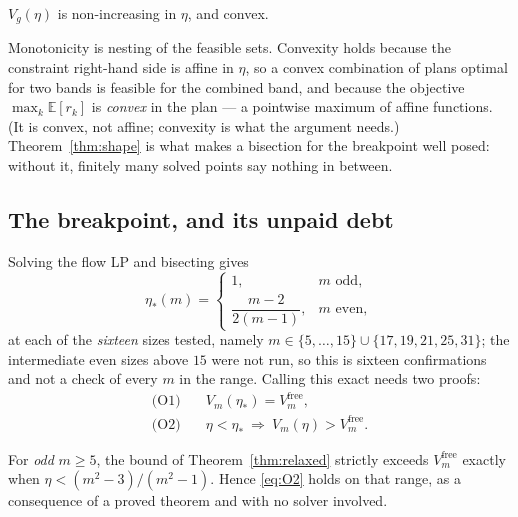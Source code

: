 \begin{theorem}
\label{thm:shape}
$V_{g}(\eta)$ is non-increasing in $\eta$, and convex.
\end{theorem}


Monotonicity is nesting of the feasible sets. Convexity holds because the constraint
right-hand side is affine in $\eta$, so a convex combination of plans optimal for two bands
is feasible for the combined band, and because the objective
$\max_{k}\mathbb{E}[r_{k}]$ is \emph{convex} in the plan --- a pointwise maximum of affine
functions. (It is convex, not affine; convexity is what the argument needs.) Theorem~\ref{thm:shape} is
what makes a bisection for the breakpoint well posed: without it, finitely many solved points
say nothing in between.

\subsection{The breakpoint, and its unpaid debt}

Solving the flow LP and bisecting gives
\begin{equation}
\eta_{*}(m)=
\begin{cases}
1, & m\text{ odd},\\[2pt]
\dfrac{m-2}{2(m-1)}, & m\text{ even},
\end{cases}
\label{eq:breakpoint}
\end{equation}
at each of the \emph{sixteen} sizes tested, namely $m\in\{5,\dots,15\}\cup\{17,19,21,25,31\}$;
the intermediate even sizes above $15$ were not run, so this is sixteen confirmations and
not a check of every $m$ in the range. \NUM{} Calling this exact needs two proofs:
\begin{align}
\text{(O1)}\quad & V_{m}(\eta_{*})=V^{\mathrm{free}}_{m},\label{eq:O1}\\
\text{(O2)}\quad & \eta<\eta_{*}\ \Longrightarrow\ V_{m}(\eta)>V^{\mathrm{free}}_{m}.
\label{eq:O2}
\end{align}

\begin{theorem}
\label{thm:o2}
For \emph{odd} $m\ge5$, the bound of Theorem~\ref{thm:relaxed} strictly exceeds
$V^{\mathrm{free}}_{m}$ exactly when $\eta<(m^{2}-3)/(m^{2}-1)$. Hence \eqref{eq:O2} holds on
that range, as a consequence of a proved theorem and with no solver involved.
\end{theorem}

